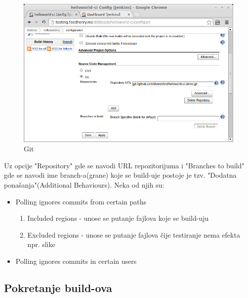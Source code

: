 \begin{figure}[h!]
\begin{center}
\includegraphics[scale=0.75, totalheight=0.4\textheight]{slike/git_jenkins.jpg}
\end{center}
\caption{Git}
\label{fig:git}
\end{figure}

Uz opcije "Repository" gde se navodi URL repozitorijuma i "Branches to build" gde se navodi ime branch-a(grane) koje se build-uje postoje je tzv. "Dodatna ponašanja"(Additional Behaviours). Neka od njih su:
 
\begin{itemize}  
\item Polling ignores commits from certain paths
\begin{enumerate}
\item Included regions - unose se putanje fajlova koje se build-uju
\item Excluded regions - unose se putanje fajlova čije testiranje nema efekta npr. slike
\end{enumerate}
\item Polling ignores commits in certain users 
\end{itemize}

\subsection{Pokretanje build-ova}

